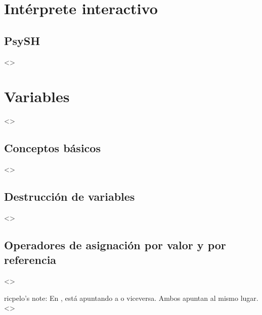 \documentclass[a4paper,12pt,spanish]{sphinxmanual}
\begin{document}
\section{Intérprete interactivo}
\label{\detokenize{php:interprete-interactivo}}

\subsection{}
\label{\detokenize{php:php-a}}

\subsection{PsySH}
\label{\detokenize{php:psysh}}
\textless{}\textgreater{}


\section{Variables}
\label{\detokenize{php:variables}}
\textless{}\textgreater{}


\subsection{Conceptos básicos}
\label{\detokenize{php:conceptos-basicos}}
\textless{}\textgreater{}


\subsection{Destrucción de variables}
\label{\detokenize{php:destruccion-de-variables}}
\textless{}\textgreater{}


\subsection{Operadores de asignación por valor y por referencia}
\label{\detokenize{php:operadores-de-asignacion-por-valor-y-por-referencia}}
\textless{}\textgreater{}

ricpelo’s note: En ,   está apuntando a 
o viceversa. Ambos apuntan al mismo
lugar. \textless{}\textgreater{}
\end{document}
